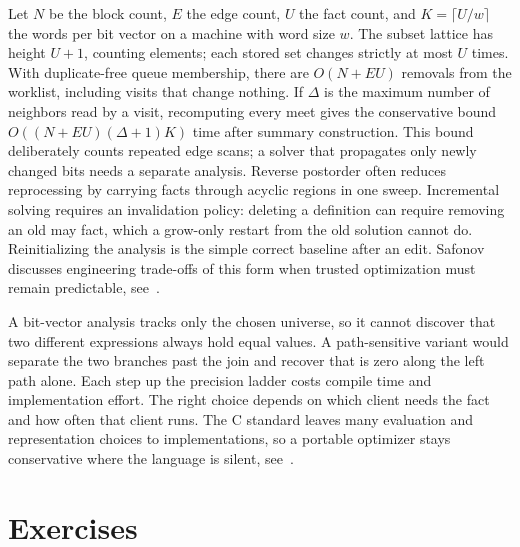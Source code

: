 Let $N$ be the block count, $E$ the edge count, $U$ the fact count, and $K=\lceil U/w\rceil$ the words per bit vector on a machine with word size $w$.
The subset lattice has height $U+1$, counting elements; each stored set changes strictly at most $U$ times.
With duplicate-free queue membership, there are $O(N+EU)$ removals from the worklist, including visits that change nothing.
If $\Delta$ is the maximum number of neighbors read by a visit, recomputing every meet gives the conservative bound $O((N+EU)(\Delta+1)K)$ time after summary construction.
This bound deliberately counts repeated edge scans; a solver that propagates only newly changed bits needs a separate analysis.
Reverse postorder often reduces reprocessing by carrying facts through acyclic regions in one sweep.
Incremental solving requires an invalidation policy: deleting a definition can require removing an old may fact, which a grow-only restart from the old solution cannot do.
Reinitializing the analysis is the simple correct baseline after an edit.
Safonov discusses engineering trade-offs of this form when trusted optimization must remain predictable, see~\cite{safonov-2010-trustworthy}.

A bit-vector analysis tracks only the chosen universe, so it cannot discover that two different expressions always hold equal values.
A path-sensitive variant would separate the two branches past the join and recover that  is zero along the left path alone.
Each step up the precision ladder costs compile time and implementation effort.
The right choice depends on which client needs the fact and how often that client runs.
The C standard leaves many evaluation and representation choices to implementations, so a portable optimizer stays conservative where the language is silent, see~\cite{wg14-2011-c11}.

\section{Exercises}
\label{sec:ch09-exercises}


